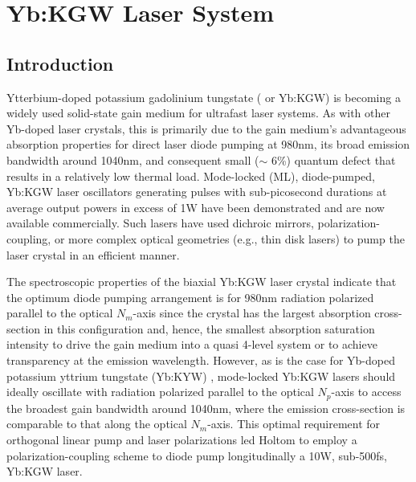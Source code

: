
\section{Yb:KGW Laser System}
\subsection{Introduction}

Ytterbium-doped potassium gadolinium tungstate ( or Yb:KGW) is becoming a widely used solid-state gain medium for ultrafast laser systems.
As with other Yb-doped laser crystals\cite{Brenier_new_criteria}, this is primarily due to the gain medium’s advantageous absorption properties for direct laser diode pumping at 980nm, its broad emission bandwidth around 1040nm, and consequent small ($\sim$ 6\%) quantum defect that results in a relatively low thermal load. 
Mode-locked (ML), diode-pumped, Yb:KGW laser oscillators generating pulses with sub-picosecond durations at average output powers in excess of 1W have been demonstrated\cite{Brunner_diode_pumped,Courjaud_high_power,Major_femtosecond_2006,Holtom_mode_locked_2006} and are now available commercially\cite{website_amplitude,website_solar}.
Such lasers have used dichroic mirrors\cite{Brunner_diode_pumped,Major_femtosecond_2006,Paunescu_diode_2004,Major_extended_2006}, polarization-coupling\cite{Holtom_mode_locked_2006}, or more complex optical geometries (e.g., thin disk lasers\cite{website_amplitude,Brunner_pulses_2002}) to pump the laser crystal in an efficient manner.

The spectroscopic properties of the biaxial Yb:KGW laser crystal\cite{Biswal_thermo_optical_05} indicate that the optimum diode pumping arrangement is for 980nm radiation polarized parallel to the optical $N_m$-axis since the crystal has the largest absorption cross-section in this configuration and, hence, the smallest absorption saturation intensity to drive the gain medium into a quasi 4-level system or to achieve transparency at the emission wavelength\cite{Brenier_new_criteria}.
However, as is the case for Yb-doped potassium yttrium tungstate (Yb:KYW) \cite{Liu_diode_pumped_2001,Killi_high_peak_2005}, mode-locked Yb:KGW lasers should ideally oscillate with radiation polarized parallel to the optical $N_p$-axis to access the broadest gain bandwidth around 1040nm, where the emission cross-section is comparable to that along the optical $N_m$-axis\cite{Holtom_mode_locked_2006,Biswal_thermo_optical_05}. This optimal requirement for orthogonal linear pump and laser polarizations led Holtom\cite{Holtom_mode_locked_2006} to employ a polarization-coupling scheme to diode pump longitudinally a 10W, sub-500fs, Yb:KGW laser.

